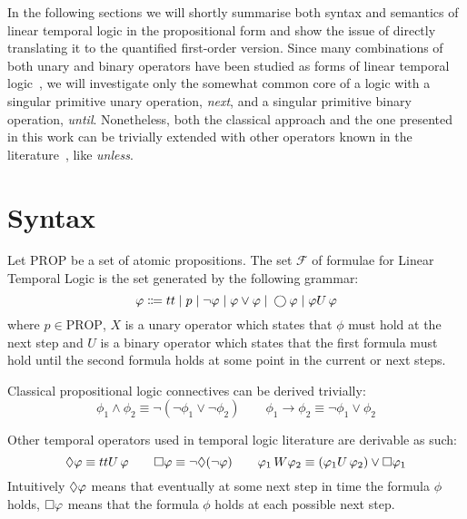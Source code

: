 In the following sections we will shortly summarise both syntax and semantics of linear temporal logic in the
propositional form and show the issue of directly translating it to the quantified first-order version. Since many
combinations of both unary and binary operators have been studied as forms of linear temporal
logic~\cite{pnueli_temporal_1977,gabbay_temporal_1994}, we will investigate only the somewhat common core of a logic
with a singular primitive unary operation, \emph{next}, and a singular primitive binary operation, \emph{until}.
Nonetheless, both the classical approach and the one presented in this work can be trivially extended with other
operators known in the literature~\cite{kroger_temporal_2008}, like \emph{unless}.

\section{Syntax}

\begin{definition}
  Let $\text{PROP}$ be a set of atomic propositions. The set $\mathcal{F}$ of formulae for Linear Temporal Logic is the
  set generated by the following grammar:
  \[
    \varphi \Coloneqq tt \;|\; p
                      \;|\; \neg\varphi
                      \;|\; \varphi \lor \varphi
                      \;|\; \bigcirc{\varphi}
                      \;|\; {\varphi}U\,{\varphi}
  \]
  where $p \in \text{PROP}$, $X$ is a unary operator which states that $\phi$ must hold at the next step and $U$ is a
  binary operator which states that the first formula must hold until the second formula holds at some point in the
  current or next steps.
\end{definition}

Classical propositional logic connectives can be derived trivially:
\[
  \phi_1 \land \phi_2 \equiv \neg(\neg\phi_1 \lor \neg\phi_2) \qquad
  \phi_1 \to \phi_2 \equiv \neg\phi_1 \lor \phi_2
\]

Other temporal operators used in temporal logic literature are derivable as such:
\[
  \Diamond{\varphi} \equiv {tt}U\,{\varphi} \qquad
  \Box{\varphi} \equiv \neg\Diamond{(}\neg\varphi) \qquad
  {\varphi_1}\,W {\varphi_2} \equiv ({\varphi_1}U\,{\varphi_2}) \lor \Box{\varphi_1}
\]
Intuitively $\Diamond{\varphi}$ means that eventually at some next step in time the formula $\phi$ holds,
$\Box{\varphi}$ means that the formula $\phi$ holds at each possible next step.

